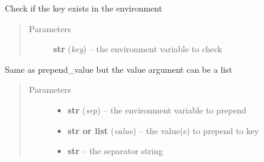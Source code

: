 \documentclass[a4paper,10pt,english]{sphinxmanual}
\begin{document}
\begin{fulllineitems}
\begin{fulllineitems}
\begin{quote}
\begin{description}
\end{description}\end{quote}

\end{fulllineitems}


\begin{fulllineitems}
\label{commands/apidoc/src:src.fileEnviron.LauncherFileEnviron.is_defined}
Check if the key exists in the environment
\begin{quote}\begin{description}
\item[{Parameters}] \leavevmode
\textbf{str} (\emph{key}) -- the environment variable to check

\end{description}\end{quote}

\end{fulllineitems}


\begin{fulllineitems}
\label{commands/apidoc/src:src.fileEnviron.LauncherFileEnviron.prepend}
Same as prepend\_value but the value argument can be a list
\begin{quote}\begin{description}
\item[{Parameters}] \leavevmode\begin{itemize}
\item {} 
\textbf{str} (\emph{sep}) -- the environment variable to prepend

\item {} 
\textbf{str or list} (\emph{value}) -- the value(s) to prepend to key

\item {} 
\textbf{str} -- the separator string

\end{itemize}

\end{description}\end{quote}

\end{fulllineitems}



\end{fulllineitems}
\end{document}
